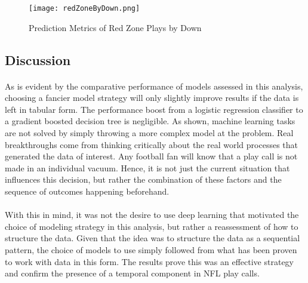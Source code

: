 \documentclass[11pt]{article}
\begin{document}
            \begin{figure}[ht]
                \texttt{[image: redZoneByDown.png]}
                \caption{Prediction Metrics of Red Zone Plays by Down}
                \label{fig:Prediction Metrics of Red Zone Plays by Down}
            \end{figure}
            \begin{multicols*}{2} 

    \section{Discussion}
        \paragraph{}
            As is evident by the comparative performance of models assessed in this analysis, choosing a fancier model strategy will only slightly improve results if the data is left in tabular form.  
            The performance boost from a logistic regression classifier to a gradient boosted decision tree is negligible. 
            As shown, machine learning tasks are not solved by simply throwing a more complex model at the problem. 
            Real breakthroughs come from thinking critically about the real world processes that generated the data of interest. 
            Any football fan will know that a play call is not made in an individual vacuum. 
            Hence, it is not just the current situation that influences this decision, but rather the combination of these factors and the sequence of outcomes happening beforehand.   
            
        \vspace{-10pt}
        \paragraph{}
            With this in mind, it was not the desire to use deep learning that motivated the choice of modeling strategy in this analysis, but rather a reassessment of how to structure the data. 
            Given that the idea was to structure the data as a sequential pattern, the choice of models to use simply followed from what has been proven to work with data in this form. 
            The results prove this was an effective strategy and confirm the presence of a temporal component in NFL play calls.
            
        \vspace{-10pt}

\end{multicols*}
\end{document}

